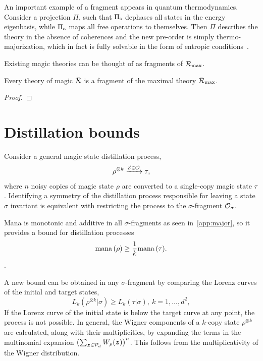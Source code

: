 \documentclass[pra,
aps,
twocolumn,
superscriptaddress,
groupedaddress,
nofootinbib,
reprint
]{revtex4-1}
\begin{document}
An important example of a fragment appears in quantum thermodynamics. 
Consider a projection $\Pi$, such that $\Pi_{\rm{s}}$ dephases all states in the energy eigenbasis, while $\Pi_{\rm{o}}$ maps all free operations to themselves.
Then $\Pi$ describes the theory in the absence of coherences and the new pre-order is simply thermo-majorization, which in fact is fully solvable in the form of entropic conditions~\cite{cit:gour}. 

Existing magic theories can be thought of as fragments of $\mathcal{R}_{\rm{}max}$.
\begin{proposition}
    Every theory of magic $\mathcal{R}$ is a fragment of the maximal theory $\mathcal{R}_{\rm{}max}$.
\end{proposition}
\begin{proof}
\end{proof}


\section{Distillation bounds}
\label{sec:distill}

Consider a general magic state distillation process,
\begin{equation}\label{eq:distprocess}
    \rho^{\otimes k} \xrightarrow{\mathcal{E} \in \mathcal{O}} \tau,
\end{equation}
where $n$ noisy copies of magic state $\rho$ are converted to a single-copy magic state $\tau$.
Identifying a symmetry of the distillation process responsible for leaving a state $\sigma$ invariant is equivalent with restricting the process to the $\sigma$-fragment $\mathcal{O}_\sigma$.

Mana is monotonic and additive in all $\sigma$-fragments as seen in~\cref{app:major}, so it provides a bound for distillation processes
\begin{equation}
    {{\rm{mana}}\left(\rho\right)} \geq \frac{1}{k} {{\rm{mana}}\left(\tau\right)}.
\end{equation}.

A new bound can be obtained in any $\sigma$-fragment by comparing the Lorenz curves of the initial and target states,
\begin{equation}\label{eq:majbound}
    L_k(\rho^{\otimes k} | \sigma) \geq L_k (\tau | \sigma),\ k=1,\dots,d^2,
\end{equation}
If the Lorenz curve of the initial state is below the target curve at any point, the process is not possible.
In general, the Wigner components of a $k$-copy state $\rho^{\otimes k}$ are calculated, along with their multiplicities, by expanding the terms in the multinomial expansion $\left( \sum_{\bm{z} \in \mathcal{P}_d} W_\rho(\bm{z}) \right)^n$.
This follows from the multiplicativity of the Wigner distribution.
\end{document}
